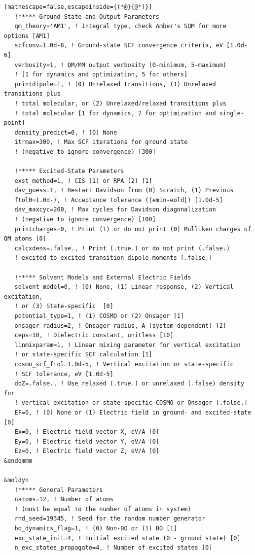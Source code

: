\documentclass[letterpaper,12pt,titlepage]{article}
\begin{document}
\begin{appendix}
\begin{lstlisting}[mathescape=false,escapeinside={(*@}{@*)}]
   !***** Ground-State and Output Parameters
   qm_theory='AM1', ! Integral type, check Amber's SQM for more options [AM1]
   scfconv=1.0d-8, ! Ground-state SCF convergence criteria, eV [1.0d-6]
   verbosity=1, ! QM/MM output verbosity (0-minimum, 5-maximum)
   ! [1 for dynamics and optimization, 5 for others]
   printdipole=1, ! (0) Unrelaxed transitions, (1) Unrelaxed transitions plus 
   ! total molecular, or (2) Unrelaxed/relaxed transitions plus 
   ! total molecular [1 for dynamics, 2 for optimization and single-point]
   density_predict=0, ! (0) None
   itrmax=300, ! Max SCF iterations for ground state 
   ! (negative to ignore convergence) [300]

   !***** Excited-State Parameters
   exst_method=1, ! CIS (1) or RPA (2) [1]
   dav_guess=1, ! Restart Davidson from (0) Scratch, (1) Previous 
   ftol0=1.0d-7, ! Acceptance tolerance (|emin-eold|) [1.0d-5]
   dav_maxcyc=200, ! Max cycles for Davidson diagonalization 
   ! (negative to ignore convergence) [100]
   printcharges=0, ! Print (1) or do not print (0) Mulliken charges of QM atoms [0]
   calcxdens=.false., ! Print (.true.) or do not print (.false.) 
   ! excited-to-excited transition dipole moments [.false.]

   !***** Solvent Models and External Electric Fields
   solvent_model=0, ! (0) None, (1) Linear response, (2) Vertical excitation, 
   ! or (3) State-specific  [0]
   potential_type=1, ! (1) COSMO or (2) Onsager [1]
   onsager_radius=2, ! Onsager radius, A (system dependent) [2]
   ceps=10, ! Dielectric constant, unitless [10]
   linmixparam=1, ! Linear mixing parameter for vertical excitation
   ! or state-specific SCF calculation [1]
   cosmo_scf_ftol=1.0d-5, ! Vertical excitation or state-specific
   ! SCF tolerance, eV [1.0d-5]
   doZ=.false., ! Use relaxed (.true.) or unrelaxed (.false) density for 
   ! vertical excitation or state-specific COSMO or Onsager [.false.]
   EF=0, ! (0) None or (1) Electric field in ground- and excited-state [0]
   Ex=0, ! Electric field vector X, eV/A [0]
   Ey=0, ! Electric field vector Y, eV/A [0]
   Ez=0, ! Electric field vector Z, eV/A [0] 
&endqmmm

&moldyn
   !***** General Parameters
   natoms=12, ! Number of atoms 
   ! (must be equal to the number of atoms in system)
   rnd_seed=19345, ! Seed for the random number generator
   bo_dynamics_flag=1, ! (0) Non-BO or (1) BO [1]
   exc_state_init=4, ! Initial excited state (0 - ground state) [0]
   n_exc_states_propagate=4, ! Number of excited states [0]


\end{lstlisting}
\end{appendix}
\end{document}
